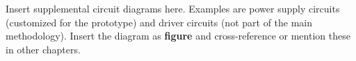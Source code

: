 Insert supplemental circuit diagrams here.
Examples are power supply circuits (customized for the prototype) and driver circuits (not part of the main methodology).
Insert the diagram as \textbf{figure} and cross-reference or mention these in other chapters.

